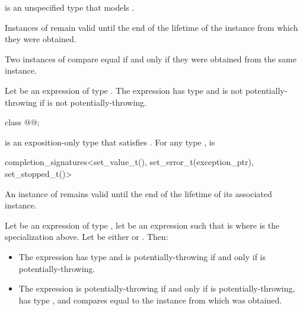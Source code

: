 \pnum
{} is an unspecified type
that models .

\pnum
Instances of  remain valid
until the end of the lifetime of the  instance
from which they were obtained.

\pnum
Two instances of  compare equal
if and only if they were obtained from the same  instance.

\pnum
Let  be an expression of type .
The expression 
has type  and
is not potentially-throwing if  is not potentially-throwing.

\begin{itemdecl}
class @@;
\end{itemdecl}

\pnum
{} is an exposition-only type
that satisfies .
For any type ,
 is
\begin{codeblock}
completion_signatures<set_value_t(), set_error_t(exception_ptr), set_stopped_t()>
\end{codeblock}

\pnum
An instance of  remains valid
until the end of the lifetime of its associated  instance.

\pnum
Let  be an expression of type ,
let  be an expression
such that  is 
where  is the  specialization above.
Let  be either  or .
Then:
\begin{itemize}
\item
The expression 
has type 
and is potentially-throwing if and only if
 is potentially-throwing.
\item
The expression 
is potentially-throwing if and only if  is potentially-throwing,
has type , and
compares equal to the  instance
from which  was obtained.
\end{itemize}

